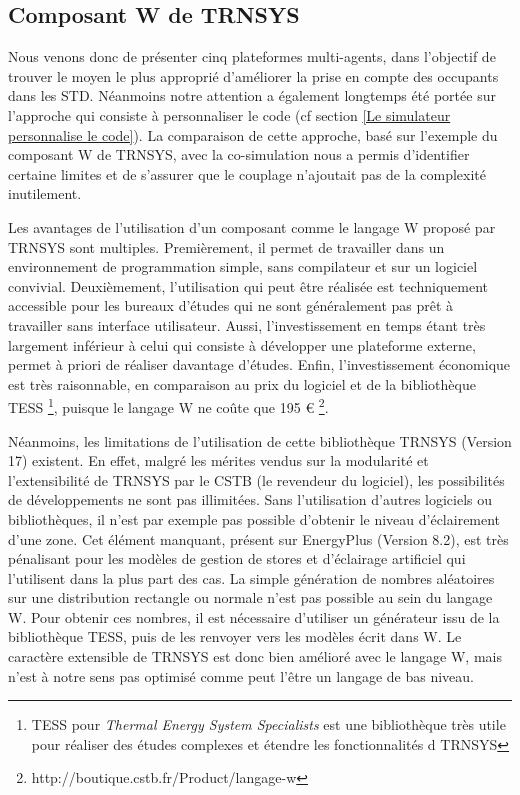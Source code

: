 \subsection{Composant W de TRNSYS}

Nous venons donc de présenter cinq plateformes multi-agents, dans l'objectif de trouver le moyen le plus approprié d'améliorer la prise en compte des occupants dans les STD. Néanmoins notre attention a également longtemps été portée sur l'approche qui consiste à personnaliser le code (cf section \ref{Le simulateur personnalise le code}). La comparaison de cette approche, basé sur l'exemple du composant W de TRNSYS, avec la co-simulation nous a permis d'identifier certaine limites et de s'assurer que le couplage n'ajoutait pas de la complexité inutilement.

Les avantages de l'utilisation d'un composant comme le langage W proposé par TRNSYS sont multiples. Premièrement, il permet de travailler dans un environnement de programmation simple, sans compilateur et sur un logiciel convivial. Deuxièmement, l'utilisation  qui peut être réalisée est techniquement accessible pour les bureaux d'études qui ne sont généralement pas prêt à travailler sans interface utilisateur. Aussi, l'investissement en temps étant très largement inférieur à celui qui consiste à développer une plateforme externe, permet à priori de réaliser davantage d'études. Enfin, l'investissement économique est très raisonnable, en comparaison au prix du logiciel et de la bibliothèque TESS \footnote{TESS pour \textit{Thermal Energy System Specialists} est une bibliothèque très utile pour réaliser des études complexes et étendre les fonctionnalités d TRNSYS}, puisque le langage W ne coûte que 195 \euro{} \footnote{http://boutique.cstb.fr/Product/langage-w}. 

Néanmoins, les limitations de l'utilisation de cette bibliothèque TRNSYS (Version 17) existent. En effet, malgré les mérites vendus sur la modularité et l'extensibilité de TRNSYS par le CSTB (le revendeur du logiciel), les possibilités de développements ne sont pas illimitées. Sans l'utilisation d'autres logiciels ou bibliothèques, il n'est par exemple pas possible d'obtenir le niveau d'éclairement d'une zone. Cet élément manquant, présent sur EnergyPlus (Version 8.2), est très pénalisant pour les modèles de gestion de stores et d'éclairage artificiel qui l'utilisent dans la plus part des cas. La simple génération de nombres aléatoires sur une distribution rectangle ou normale n'est pas possible au sein du langage W. Pour obtenir ces nombres, il est nécessaire d'utiliser un générateur issu de la bibliothèque TESS, puis de les renvoyer vers les modèles écrit dans W. Le caractère extensible de TRNSYS est donc bien amélioré avec le langage W, mais n'est à notre sens pas optimisé comme peut l'être un langage de bas niveau.

